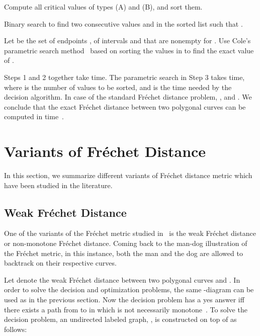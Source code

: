 \documentclass[12pt]{dalthesis}
\newcommand{\Frechet}{Fr\'echet }
\begin{document}
\begin{algorithm} [t]
\caption {\sc Standard \Frechet Computation Algorithm~\cite{AltG95} } \label{alg:CompFD}
\begin{algorithmic}[1]
	\vspace{0.5em}
	\baselineskip

\STATE Compute all critical values of types (A) and (B), and sort them.
	
	\STATE Binary search to find two consecutive values   and  in  the sorted list
	such that .
	
	\STATE Let  be the set of endpoints ,  of intervals  
	 and  that are nonempty for .
	Use Cole's parametric search method~\cite{Cole87}  based on sorting the values in  
	to find the exact value of .

\end{algorithmic}
\end{algorithm}




Steps 1 and 2 together take  time. 
The parametric search in Step 3 takes  time,
where  is the number of values to be sorted, 
and  is the time needed by the decision algorithm.
In case of the standard \Frechet distance problem, , and .
We conclude that the exact \Frechet distance between two polygonal curves 
can be computed in  time~\cite{AltG95}. 







\section{Variants of \Frechet Distance}

In this section, we summarize different variants 
of \Frechet distance metric
which have been studied in the literature.



\subsection{Weak \Frechet Distance}

One of the variants of the \Frechet metric studied in~\cite{AltG95} is the weak \Frechet
distance or non-monotone \Frechet distance. Coming back to the man-dog illustration 
of the \Frechet metric, in this instance,  
both the man and the dog are allowed to 
backtrack on their respective curves.

Let  denote the weak \Frechet distance between two polygonal curves 
and . In order to solve the decision and optimization problems, 
the same -diagram 
can be used as in the previous section. 
Now the decision problem has a yes answer iff 
there exists a path from  to  in  which is not necessarily monotone~\cite{AltG95}. 
To solve the decision problem, an undirected labeled graph, , is constructed 
on top of  as follows:
\end{document}
